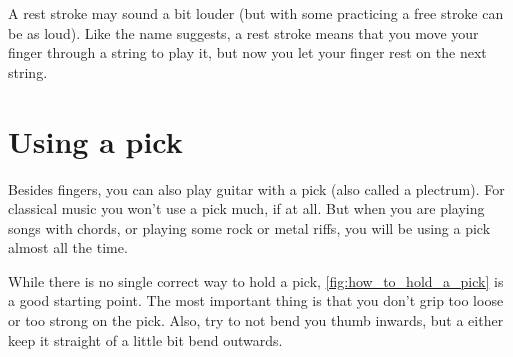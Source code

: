 A rest stroke may sound a bit louder (but with some practicing a free stroke can be as loud). Like the name suggests, a rest stroke means that you move your finger through a string to play it, but now you let your finger rest on the next string.

\section{Using a pick}

Besides fingers, you can also play guitar with a pick (also called a plectrum). For classical music you won't use a pick much, if at all. But when you are playing songs with chords, or playing some rock or metal riffs, you will be using a pick almost all the time.

While there is no single correct way to hold a pick, \autoref{fig:how_to_hold_a_pick} is a good starting point. The most important thing is that you don't grip too loose or too strong on the pick. Also, try to not bend you thumb inwards, but a either keep it straight of a little bit bend outwards.

